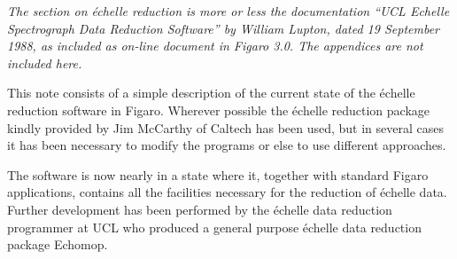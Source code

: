 \documentclass[11pt,twoside]{article}
\begin{document}
%
%
%

{\em
   The section on \'echelle reduction is more or less the
   documentation ``UCL Echelle Spectrograph Data Reduction Software'' by
   William Lupton, dated 19 September 1988, as included as on-line
   document in Figaro 3.0. The appendices are not included here.
\/}

   This note consists of a simple description of the current state of
   the \'echelle reduction software in Figaro. Wherever possible
   the \'echelle reduction package kindly provided by Jim McCarthy
   of Caltech has been used, but in several cases it has been necessary
   to modify the programs or else to use different approaches.

   The software is now nearly in a state where it, together with
   standard Figaro applications, contains all the facilities necessary
   for the reduction of \'echelle data. Further development has
   been performed by the \'echelle data reduction programmer at UCL
   who produced a general purpose \'echelle data reduction package
   Echomop.
\end{document}
